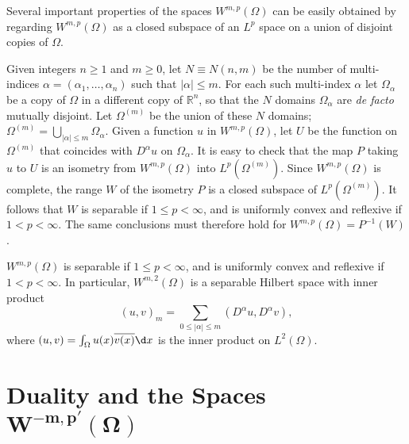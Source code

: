 \begin{para}
  Several important properties of the spaces $W^{m,p}(\Omega)$ can be easily obtained by 
  regarding $W^{m,p}(\Omega)$ as a closed subspace of an $L^p$ space on a union of disjoint 
  copies of $\Omega$.
  
  Given integers $n \geq 1$ and $m \geq 0$, let $N \equiv N(n, m)$ be the number of multi-indices 
  $\alpha=\left(\alpha_1, \ldots, \alpha_n\right)$ such that $|\alpha| \leq m$. For each such 
  multi-index $\alpha$ let $\Omega_\alpha$ be a copy of $\Omega$ in a different copy of
  $\mathbb{R}^n$, so that the $N$ domains $\Omega_\alpha$ are \emph{de facto} mutually disjoint.
  Let $\Omega^{(m)}$ be the union of these $N$ domains;
  $\Omega^{(m)}=\bigcup_{|\alpha| \leq m} \Omega_\alpha$.
  Given a function $u$ in $W^{m,p}(\Omega)$, let $U$ be the function on $\Omega^{(m)}$ that 
  coincides with $D^\alpha u$ on $\Omega_\alpha$. It is easy to check that the map $P$ taking $u$ 
  to $U$ is an isometry from $W^{m,p}(\Omega)$ into $L^p(\Omega^{(m)})$.
  Since $W^{m,p}(\Omega)$ is complete, the range $W$ of the isometry $P$ is a closed subspace of 
  $L^p(\Omega^{(m)})$. It follows that $W$ is separable if $1 \leq p<\infty$,
  and is uniformly convex and reflexive if $1<p<\infty$. The same conclusions must therefore hold 
  for $W^{m,p}(\Omega)=P^{-1}(W)$.
\end{para}


\begin{theorem}
  $W^{m,p}(\Omega)$ is separable if $1 \leq p<\infty$, and is uniformly convex and reflexive if 
  $1<p<\infty$. In particular, $W^{m, 2}(\Omega)$ is a separable Hilbert space with inner product
  \[(u, v)_m=\sum_{0 \leq|\alpha| \leq m}\left(D^\alpha u, D^\alpha v\right),\]
  where $(u, v)=\int_{\Omega} u(x) \overline{v(x)} \d x$ is the inner product on $L^2(\Omega)$.
\end{theorem}


\section[Duality and the Spaces $W^{-m,p'}(\Omega)$]%
  {Duality and the Spaces $\bm{W^{-m,p'}(\Omega)}$}


